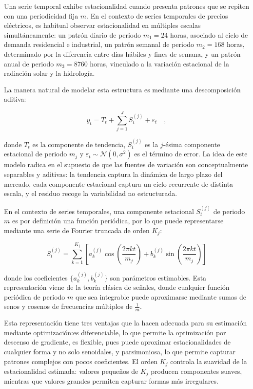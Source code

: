 Una serie temporal exhibe estacionalidad cuando presenta patrones que se repiten con una periodicidad fija $m$. En el contexto de series temporales de precios eléctricos, es habitual observar estacionalidad en múltiples escalas simultáneamente: un patrón diario de periodo $m_1=24$ horas, asociado al ciclo de demanda residencial e industrial, un patrón semanal de periodo $m_2=168$ horas, determinado por la diferencia entre días hábiles y fines de semana, y un patrón anual de periodo $m_3=8760$ horas, vinculado a la variación estacional de la radiación solar y la hidrología.

La manera natural de modelar esta estructura es mediante una descomposición aditiva:

\begin{equation}
    y_t = T_t + \sum_{j=1}^{J} S_t^{(j)} + \varepsilon_t\quad,
\end{equation}

donde $T_t$ es la componente de tendencia, $S_t^{(j)}$ es la $j$-ésima componente estacional de periodo $m_j$ y $\varepsilon_t \sim \mathcal{N}(0, \sigma^2)$ es el término de error. La idea de este modelo radica en el supuesto de que las fuentes de variación son conceptualmente separables y aditivas: la tendencia captura la dinámica de largo plazo del mercado, cada componente estacional captura un ciclo recurrente de distinta escala, y el residuo recoge la variabilidad no estructurada.

En el contexto de series temporales, una componente estacional $S_t^{(j)}$ de periodo $m$ es por definición una función periódica, por lo que puede representarse mediante una serie de Fourier truncada de orden $K_j$:

\begin{equation}
    S_t^{(j)} = \sum_{k=1}^{K_j} \left[ a_k^{(j)} \cos\left(\frac{2\pi k t}{m_j}\right) + b_k^{(j)} \sin\left(\frac{2\pi k t}{m_j}\right) \right]
\end{equation}

donde los coeficientes $\{a_k^{(j)}, b_k^{(j)}\}$ son parámetros estimables. Esta representación viene de la teoría clásica de señales, donde cualquier función periódica de periodo $m$ que sea integrable puede aproximarse mediante sumas de senos y cosenos de frecuencias múltiplos de $\frac{1}{m}$.

Esta representación tiene tres ventajas que la hacen adecuada para su estimación mediante optimización:es diferenciable, lo que permite la optimización por descenso de gradiente, es flexible, pues puede aproximar estacionalidades de cualquier forma y no solo senoidales, y parsimoniosa, lo que permite capturar patrones complejos con pocos coeficientes. El orden $K_j$ controla la suavidad de la estacionalidad estimada: valores pequeños de $K_j$ producen componentes suaves, mientras que valores grandes permiten capturar formas más irregulares.

